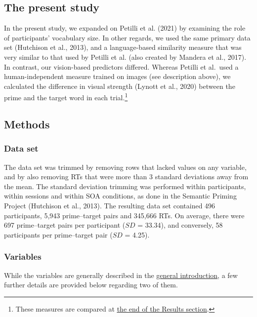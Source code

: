\documentclass[
  12pt,
  man,floatsintext]{apa7}
\begin{document}
\hypertarget{the-present-study}{%
\subsection{The present study}\label{the-present-study}}

In the present study, we expanded on Petilli et al. (2021) by examining the role of participants' vocabulary size. In other regards, we used the same primary data set (Hutchison et al., 2013), and a language-based similarity measure that was very similar to that used by Petilli et al. (also created by Mandera et al., 2017). In contrast, our vision-based predictors differed. Whereas Petilli et al.~used a human-independent measure trained on images (see description above), we calculated the difference in visual strength (Lynott et al., 2020) between the prime and the target word in each trial.\footnote{These measures are compared at \protect\hyperlink{results-human-based-and-computational-measures-of-visual-information}{\underline{the end of the Results section}}.}

\hypertarget{methods}{%
\subsection{Methods}\label{methods}}

\hypertarget{semanticpriming-dataset}{%
\subsubsection{Data set}\label{semanticpriming-dataset}}

The data set was trimmed by removing rows that lacked values on any variable, and by also removing RTs that were more than 3 standard deviations away from the mean. The standard deviation trimming was performed within participants, within sessions and within SOA conditions, as done in the Semantic Priming Project (Hutchison et al., 2013). The resulting data set contained 496 participants, 5,943 prime--target pairs and 345,666 RTs. On average, there were 697 prime--target pairs per participant (\(SD\) = 33.34), and conversely, 58 participants per prime--target pair (\(SD\) = 4.25).

\hypertarget{variables}{%
\subsubsection{Variables}\label{variables}}

While the variables are generally described in the \protect\hyperlink{present-studies}{\underline{general introduction}}, a few further details are provided below regarding two of them.
\end{document}
